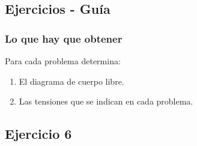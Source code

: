 \documentclass[12pt]{beamer}
\begin{document}
\subsection{Ejercicios - Guía}

\begin{frame}
\frametitle{Lo que hay que obtener}
Para cada problema determina:
\pause
{}
\begin{enumerate}[<+->]
\item El diagrama de cuerpo libre.
\item Las tensiones que se indican en cada problema.
\end{enumerate}
\end{frame}

\subsection*{Ejercicio 6}
\end{document}
